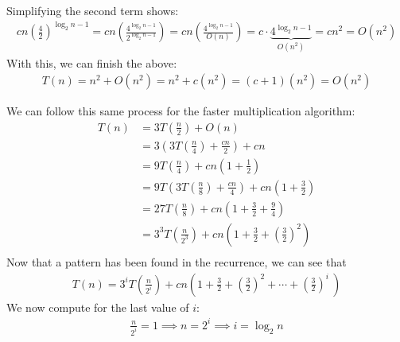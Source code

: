 \documentclass[14pt]{extarticle}
\begin{document}
    Simplifying the second term shows:
    \begin{align*}
        cn\left(\frac{4}{2}\right)^{\log_2 n - 1}
        =
        cn\left(
            \frac{4^{\log_2 n - 1}}{2^{\log_2 n - 1}}
        \right)
        =
        cn\left(
            \frac{4^{\log_2 n - 1}}{O(n)}
        \right)
        =
       c\cdot \underbrace{4^{\log_2 n - 1}}_{O\left(n^2\right)}
       =
       cn^2
       = O(n^2)
    \end{align*}
    With this, we can finish the above:
    \begin{align*}
        T(n) = n^2 + O(n^2) = n^2 + c(n^2) = (c + 1)(n^2) 
        = \boxed{O\left(n^2\right)}
    \end{align*}

    We can follow this same process for the faster multiplication algorithm:
    \begin{align*}
        T(n) &= 3T\left(\frac{n}{2}\right) + O(n)                       \\
             &= 3\left(
                    3T\left(\frac{n}{4}\right) + \frac{cn}{2}
                \right) + cn                                            \\
             &= 9T\left(\frac{n}{4}\right) 
                + cn\left(1 + \frac{1}{2}\right)                        \\
             &= 9T\left(
                3T\left(\frac{n}{8}\right) + \frac{cn}{4}
                \right) + cn\left(1 + \frac{3}{2}\right)                \\
             &= 27T\left(\frac{n}{8}
                \right) + cn\left(1 + \frac{3}{2}
                + \frac{9}{4}\right)                                    \\
             &= 3^3T\left(\frac{n}{2^3}
                \right) + cn\left(1 + \frac{3}{2}
                + \left(\frac{3}{2}\right)^2\right)                     \\
    \end{align*}
    Now that a pattern has been found in the recurrence, we can see that
    \begin{align*}
        T(n) = 3^iT\left(\frac{n}{2^i}\right) + 
            cn\left(1 + \frac{3}{2} 
            + \left(\frac{3}{2}\right)^2 
            + \cdots
            + \left(\frac{3}{2}\right)^i\
        \right)
    \end{align*}
    We now compute for the last value of $i$:
    \begin{align*}
        \frac{n}{2^i} = 1 \implies n = 2^i \implies i = \log_2 n
    \end{align*}
\end{document}
